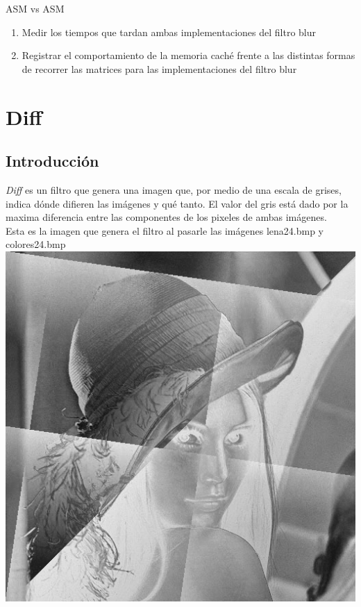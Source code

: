 \documentclass[10pt,a4paper,spanish]{article}
\begin{document}
ASM vs ASM

\begin{enumerate}
	\item Medir los tiempos que tardan ambas implementaciones del filtro blur
	\item Registrar el comportamiento de la memoria caché frente a las distintas formas de recorrer las matrices para las implementaciones del filtro blur
\end{enumerate}

\section{Diff}

\subsection{Introducción}

\textit{Diff} es un filtro que genera una imagen que, por medio de una escala de grises, indica dónde difieren las imágenes y qué tanto.
El valor del gris está dado por la maxima diferencia entre las componentes de los pixeles de ambas imágenes. \\

Esta es la imagen que genera el filtro al pasarle las imágenes lena24.bmp y colores24.bmp \\

\includegraphics[keepaspectratio]{diff_lena24_colores24.png}
\end{document}
